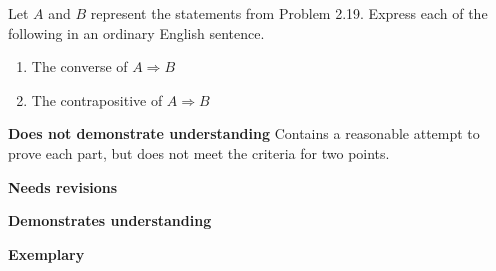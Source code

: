\documentclass[letterpaper, 11pt]{../ximera}
\begin{document}
\begin{solution}
\end{solution}


\begin{ex}
 Let $A$ and $B$ represent the statements from Problem 2.19. Express each of the following in an ordinary English sentence.
 
\begin{enumerate}[label=(\alph*)]
 \item The converse of $A\Rightarrow B$
  \item The contrapositive of $A\Rightarrow B$
\end{enumerate}
\end{ex}

\begin{writeRubric}
    \item \textbf{Does not demonstrate understanding}
     Contains a reasonable attempt to prove each part, but does not meet the criteria for two points.
    \item \textbf{Needs revisions}
     
    \item \textbf{Demonstrates understanding}
    
    \item \textbf{Exemplary}
        
\end{writeRubric}
                                       \begin{solution}
\end{solution}
\end{document}

